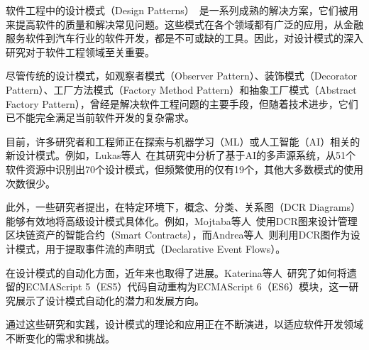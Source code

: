 软件工程中的设计模式（Design Patterns）~\cite{design_patterns, java_design_patterns}是一系列成熟的解决方案，它们被用来提高软件的质量和解决常见问题。这些模式在各个领域都有广泛的应用，从金融服务软件到汽车行业的软件开发，都是不可或缺的工具。因此，对设计模式的深入研究对于软件工程领域至关重要。

尽管传统的设计模式，如观察者模式（Observer Pattern）、装饰模式（Decorator Pattern）、工厂方法模式（Factory Method Pattern）和抽象工厂模式（Abstract Factory Pattern）\cite{gamma1995design}，曾经是解决软件工程问题的主要手段，但随着技术进步，它们已不能完全满足当前软件开发的复杂需求。

目前，许多研究者和工程师正在探索与机器学习（ML）或人工智能（AI）相关的新设计模式。例如，Lukas等人~\cite{heiland2023design}在其研究中分析了基于AI的多声源系统，从51个软件资源中识别出70个设计模式，但频繁使用的仅有19个，其他大多数模式的使用次数很少。

此外，一些研究者提出，在特定环境下，概念、分类、关系图（DCR Diagrams）能够有效地将高级设计模式具体化。例如，Mojtaba等人~\cite{eshghie2023capturing}使用DCR图来设计管理区块链资产的智能合约（Smart Contracts），而Andrea等人~\cite{burattin2022monitoring}则利用DCR图作为设计模式，用于提取事件流的声明式（Declarative Event Flows）。

在设计模式的自动化方面，近年来也取得了进展。Katerina等人~\cite{paltoglou2021automated}研究了如何将遗留的ECMAScript 5（ES5）代码自动重构为ECMAScript 6（ES6）模块，这一研究展示了设计模式自动化的潜力和发展方向。

通过这些研究和实践，设计模式的理论和应用正在不断演进，以适应软件开发领域不断变化的需求和挑战。
